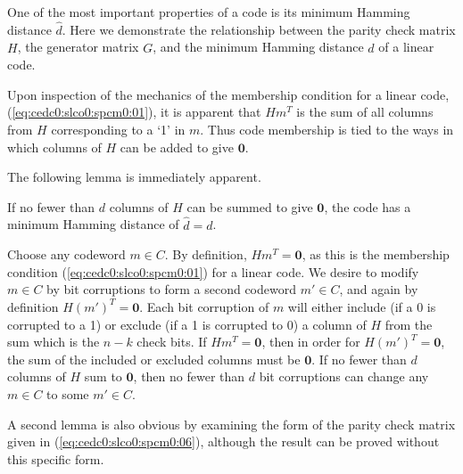 One of the most important properties of a code is its minimum Hamming distance
$\hat{d}$.  Here we demonstrate the relationship between the parity check matrix
$H$, the generator matrix $G$, and the minimum Hamming distance $\hat{d}$ of a 
linear code.

Upon inspection of the mechanics of the membership condition for a linear
code, (\ref{eq:cedc0:slco0:spcm0:01}), it is apparent that 
$Hm^T$ is the sum of all columns from $H$ corresponding to a `1' in
$m$.  Thus code membership is tied to the ways in which columns of 
$H$ can be added to give $\mathbf{0}$.

The following lemma is immediately apparent.

\begin{vworklemmastatement}
\label{lem:cedc0:slco0:spcd0:01}
If no fewer than $d$ columns of $H$ can be summed to give $\mathbf{0}$,
the code has a minimum Hamming distance of $\hat{d}=d$.
\end{vworklemmastatement}
\begin{vworklemmaproof}
Choose any codeword $m \in C$.  By definition,
$Hm^T = \mathbf{0}$, as this is the membership
condition (\ref{eq:cedc0:slco0:spcm0:01}) for a linear code.  We desire
to modify $m \in C$ by bit corruptions to form a second codeword $m' \in C$, 
and again by definition
$H(m')^T = \mathbf{0}$.  Each bit corruption of $m$ will either include (if a 0 is corrupted
to a 1) or exclude (if a 1 is corrupted to 0) a
column of $H$ from the sum which is the $n-k$ check bits.  If $Hm^T = \mathbf{0}$,
then in order for $H(m')^T = \mathbf{0}$, the sum of the included or excluded columns
must be $\mathbf{0}$.  If no fewer than $d$ columns of $H$ sum to $\mathbf{0}$, then
no fewer than $d$ bit corruptions can change any $m \in C$ to some $m' \in C$.
\end{vworklemmaproof}
\vworklemmafooter{}

A second lemma is also obvious by examining the form of the 
parity check matrix given in (\ref{eq:cedc0:slco0:spcm0:06}), although
the result can be proved without this specific form.

